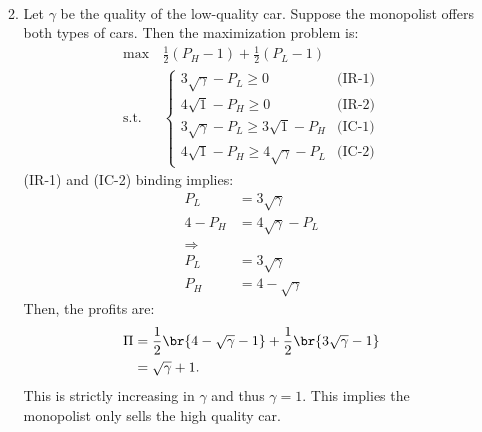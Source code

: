 \begin{enumerate}
\begin{enumerate}
\begin{align*}
		            \end{align*}
		      \item Let $\gamma$ be the quality of the low-quality car. Suppose the monopolist
		            offers both types of cars. Then the maximization problem is:
		            \begin{align*}
			            \max\,       & \frac{1}{2}(P_H-1)+\frac{1}{2}(P_L-1)               \\
			            \text{s.t. } & \begin{cases}
				                           3\sqrt{\gamma}-P_L\geq0             & \text{(IR-1)} \\
				                           4\sqrt{1}-P_H\geq0                  & \text{(IR-2)} \\
				                           3\sqrt{\gamma}-P_L\geq3\sqrt{1}-P_H & \text{(IC-1)} \\
				                           4\sqrt{1}-P_H\geq4\sqrt{\gamma}-P_L & \text{(IC-2)}
			                           \end{cases}
		            \end{align*}
		            (IR-1) and (IC-2) binding implies:
		            \begin{align*}
			            P_L   & =3\sqrt{\gamma}     \\
			            4-P_H & =4\sqrt{\gamma}-P_L \\
			            \Longrightarrow             \\
			            P_L   & =3\sqrt\gamma       \\
			            P_H   & =4-\sqrt\gamma
		            \end{align*}
		            Then, the profits are:
		            \begin{align*}
			            \Pi & =\frac{1}{2}\br{4-\sqrt\gamma-1}+\frac{1}{2}\br{3\sqrt\gamma-1} \\
			                & =\sqrt\gamma+1.
		            \end{align*}
		            This is strictly increasing in $\gamma$ and thus $\gamma=1$. This implies
		            the monopolist only sells the high quality car.
	      \end{enumerate}
\end{enumerate}
